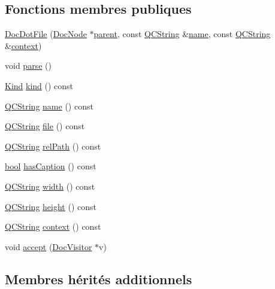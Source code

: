 \subsection*{Fonctions membres publiques}
\begin{DoxyCompactItemize}
\item 
\hyperlink{class_doc_dot_file_a7666f3059947cfb94d1f71c85016636b}{Doc\+Dot\+File} (\hyperlink{class_doc_node}{Doc\+Node} $\ast$\hyperlink{class_doc_node_a990d8b983962776a647e6231d38bd329}{parent}, const \hyperlink{class_q_c_string}{Q\+C\+String} \&\hyperlink{class_doc_dot_file_ac83aee171cfcabca5ad690cec685b103}{name}, const \hyperlink{class_q_c_string}{Q\+C\+String} \&\hyperlink{class_doc_dot_file_a104f3d1cef26826c7c9b3d57f43bda19}{context})
\item 
void \hyperlink{class_doc_dot_file_aff5e6af68571c92f73e0a5b07f900cb3}{parse} ()
\item 
\hyperlink{class_doc_node_aebd16e89ca590d84cbd40543ea5faadb}{Kind} \hyperlink{class_doc_dot_file_a8da6c248870bf1cf517f8121033a7b01}{kind} () const 
\item 
\hyperlink{class_q_c_string}{Q\+C\+String} \hyperlink{class_doc_dot_file_ac83aee171cfcabca5ad690cec685b103}{name} () const 
\item 
\hyperlink{class_q_c_string}{Q\+C\+String} \hyperlink{class_doc_dot_file_aa9859c6e9d72e4fd2eadd924461ec8af}{file} () const 
\item 
\hyperlink{class_q_c_string}{Q\+C\+String} \hyperlink{class_doc_dot_file_a227aedf4f0dfd89eccf7935adbabb128}{rel\+Path} () const 
\item 
\hyperlink{qglobal_8h_a1062901a7428fdd9c7f180f5e01ea056}{bool} \hyperlink{class_doc_dot_file_a0dde72d1f3530fbc72fe7222925b03a1}{has\+Caption} () const 
\item 
\hyperlink{class_q_c_string}{Q\+C\+String} \hyperlink{class_doc_dot_file_a3ba91d5b249ff5862410ad3f7531c00f}{width} () const 
\item 
\hyperlink{class_q_c_string}{Q\+C\+String} \hyperlink{class_doc_dot_file_afb53537a278bf47d32a974d9e9f00ee7}{height} () const 
\item 
\hyperlink{class_q_c_string}{Q\+C\+String} \hyperlink{class_doc_dot_file_a104f3d1cef26826c7c9b3d57f43bda19}{context} () const 
\item 
void \hyperlink{class_doc_dot_file_aa703c320494383f6b44a257b5db4ef4c}{accept} (\hyperlink{class_doc_visitor}{Doc\+Visitor} $\ast$v)
\end{DoxyCompactItemize}
\subsection*{Membres hérités additionnels}


